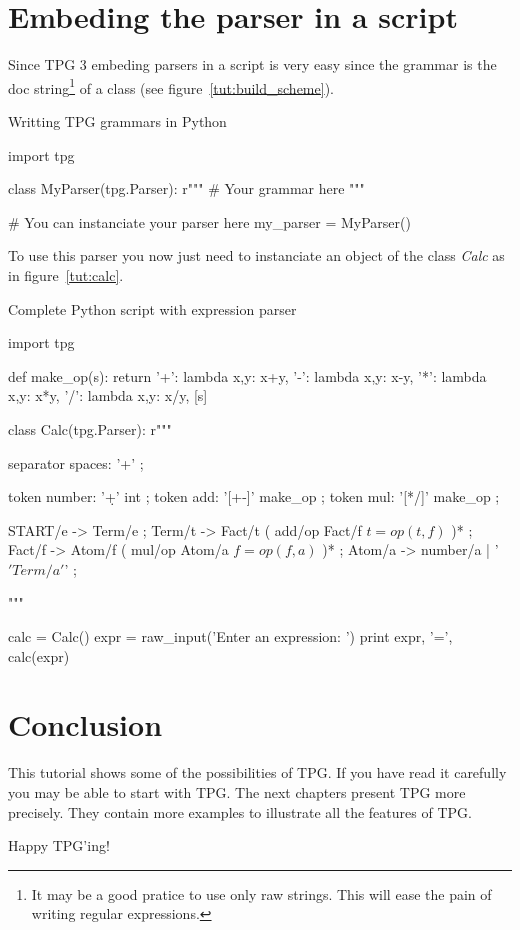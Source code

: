 \section{Embeding the parser in a script}

Since TPG 3 embeding parsers in a script is very easy since the grammar is the doc string\footnote{It may be a good pratice to use only raw strings. This will ease the pain of writing regular expressions.} of a class (see figure~\ref{tut:build_scheme}).

\begin{code}
\caption{Writting TPG grammars in Python}             \label{tut:build_scheme}
\begin{verbatimtab}[4]
import tpg

class MyParser(tpg.Parser):
    r""" # Your grammar here """

# You can instanciate your parser here
my_parser = MyParser()
\end{verbatimtab}
\end{code}

To use this parser you now just need to instanciate an object of the class \emph{Calc} as in figure~\ref{tut:calc}.

\begin{code}
\caption{Complete Python script with expression parser}     \label{tut:calc}
\begin{verbatimtab}[4]
import tpg

def make_op(s):
    return {
        '+': lambda x,y: x+y,
        '-': lambda x,y: x-y,
        '*': lambda x,y: x*y,
        '/': lambda x,y: x/y,
    }[s]

class Calc(tpg.Parser):
    r"""

    separator spaces: '\s+' ;

    token number: '\d+' int ;
    token add: '[+-]' make_op ;
    token mul: '[*/]' make_op ;

    START/e -> Term/e ;
    Term/t -> Fact/t ( add/op Fact/f $t=op(t,f)$ )* ;
    Fact/f -> Atom/f ( mul/op Atom/a $f=op(f,a)$ )* ;
    Atom/a -> number/a | '\(' Term/a '\)' ;

    """

calc = Calc()
expr = raw_input('Enter an expression: ')
print expr, '=', calc(expr)
\end{verbatimtab}
\end{code}

\clearpage

\section{Conclusion}

This tutorial shows some of the possibilities of TPG.
If you have read it carefully you may be able to start with TPG.
The next chapters present TPG more precisely.
They contain more examples to illustrate all the features of TPG.

Happy TPG'ing!
